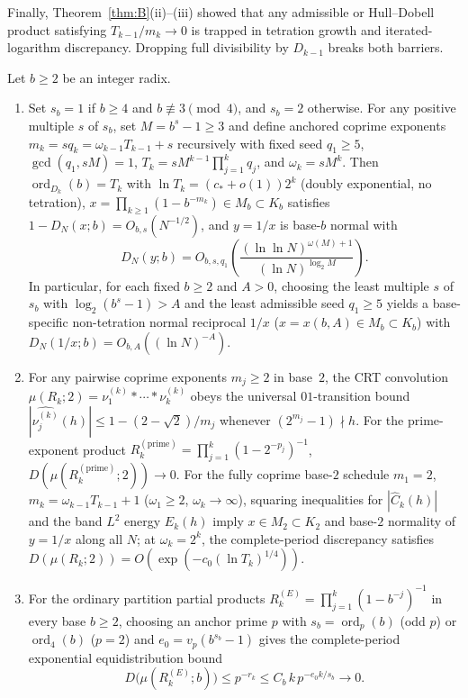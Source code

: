 \documentclass[11pt]{article}
\DeclareMathOperator{\ord}{ord}
\begin{document}
Finally, Theorem~\ref{thm:B}(ii)--(iii) showed that any admissible or Hull--Dobell product satisfying $T_{k-1}/m_k\to0$ is trapped in tetration growth and iterated-logarithm discrepancy. Dropping full divisibility by $D_{k-1}$ breaks both barriers.

\begin{maintheorem}\label{thm:E}
Let $b\ge2$ be an integer radix.
\begin{enumerate}[label=\textup{(\roman*)},nosep]
\item {} Set $s_b=1$ if $b\ge4$ and $b\not\equiv3\pmod4$, and $s_b=2$ otherwise. For any positive multiple $s$ of $s_b$, set $M=b^s-1\ge3$ and define anchored coprime exponents $m_k=sq_k=\omega_{k-1}T_{k-1}+s$ recursively with fixed seed $q_1\ge5$, $\gcd(q_1,sM)=1$, $T_k=sM^{k-1}\prod_{j=1}^k q_j$, and $\omega_k=sM^k$. Then $\ord_{D_k}(b)=T_k$ with $\ln T_k=(c_*+o(1))2^k$ (doubly exponential, no tetration), $x=\prod_{k\ge1}(1-b^{-m_k})\in M_b\subset K_b$ satisfies $1-D_N(x;b)=O_{b,s}(N^{-1/2})$, and $y=1/x$ is base-$b$ normal with
\[
D_N(y;b)=O_{b,s,q_1}\!\left(\frac{(\ln\ln N)^{\omega(M)+1}}{(\ln N)^{\log_2 M}}\right).
\]
In particular, for each fixed $b\ge2$ and $A>0$, choosing the least multiple $s$ of $s_b$ with $\log_2(b^s-1)>A$ and the least admissible seed $q_1\ge5$ yields a base-specific non-tetration normal reciprocal $1/x$ ($x=x(b,A)\in M_b\subset K_b$) with $D_N(1/x;b)=O_{b,A}((\ln N)^{-A})$.
\item {} For any pairwise coprime exponents $m_j\ge2$ in base~$2$, the CRT convolution $\mu(R_k;2)=\nu_1^{(k)}*\cdots*\nu_k^{(k)}$ obeys the universal $01$-transition bound $|\widehat{\nu_j^{(k)}}(h)|\le 1-(2-\sqrt2)/m_j$ whenever $(2^{m_j}-1)\nmid h$. For the prime-exponent product $R_k^{(\mathrm{prime})}=\prod_{j=1}^k(1-2^{-p_j})^{-1}$, $D(\mu(R_k^{(\mathrm{prime})};2))\to0$. For the fully coprime base-$2$ schedule $m_1=2$, $m_k=\omega_{k-1}T_{k-1}+1$ ($\omega_1\ge2$, $\omega_k\to\infty$), squaring inequalities for $|\widehat C_k(h)|$ and the band $L^2$ energy $E_k(h)$ imply $x\in M_2\subset K_2$ and base-$2$ normality of $y=1/x$ along all $N$; at $\omega_k=2^k$, the complete-period discrepancy satisfies $D(\mu(R_k;2))=O(\exp(-c_0(\ln T_k)^{1/4}))$.
\item {} For the ordinary partition partial products $R_k^{(E)}=\prod_{j=1}^k(1-b^{-j})^{-1}$ in every base $b\ge2$, choosing an anchor prime $p$ with $s_b=\ord_p(b)$ (odd $p$) or $\ord_4(b)$ ($p=2$) and $e_0=v_p(b^{s_b}-1)$ gives the complete-period exponential equidistribution bound
\[
D\bigl(\mu(R_k^{(E)};b)\bigr)\le p^{-r_k}\le C_b\,k\,p^{-e_0 k/s_b}\longrightarrow0.
\]
\end{enumerate}
\end{maintheorem}
\end{document}

